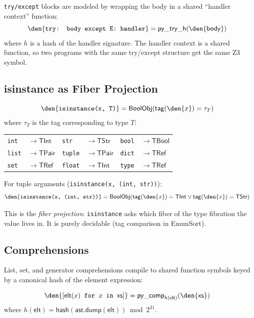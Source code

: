 \texttt{try/except} blocks are modeled by wrapping the body in a
shared ``handler context'' function:
\[
  \den{\texttt{try: body except E: handler}} =
  \mathsf{py\_try\_h}(\den{\mathsf{body}})
\]
where $h$ is a hash of the handler signature.  The handler context
is a shared function, so two programs with the same try/except
structure get the same Z3 symbol.

\subsection{isinstance as Fiber Projection}

\begin{definition}
\[
  \den{\texttt{isinstance(x, T)}} = \mathsf{BoolObj}(\mathsf{tag}(\den{x}) = \tau_T)
\]
where $\tau_T$ is the tag corresponding to type $T$:

\begin{center}
\begin{tabular}{l l l l l l}
  \texttt{int} & $\to \mathsf{TInt}$ &
  \texttt{str} & $\to \mathsf{TStr}$ &
  \texttt{bool} & $\to \mathsf{TBool}$ \\
  \texttt{list} & $\to \mathsf{TPair}$ &
  \texttt{tuple} & $\to \mathsf{TPair}$ &
  \texttt{dict} & $\to \mathsf{TRef}$ \\
  \texttt{set} & $\to \mathsf{TRef}$ &
  \texttt{float} & $\to \mathsf{TInt}$ &
  \texttt{type} & $\to \mathsf{TRef}$
\end{tabular}
\end{center}

For tuple arguments (\texttt{isinstance(x, (int, str))}):
\[
  \den{\texttt{isinstance(x, (int, str))}} =
    \mathsf{BoolObj}(\mathsf{tag}(\den{x}) = \mathsf{TInt} \lor
    \mathsf{tag}(\den{x}) = \mathsf{TStr})
\]
\end{definition}

This is the \emph{fiber projection}: \texttt{isinstance} asks
which fiber of the type fibration the value lives in.  It is
purely decidable (tag comparison in EnumSort).

\subsection{Comprehensions}

List, set, and generator comprehensions compile to shared function
symbols keyed by a canonical hash of the element expression:

\begin{definition}
\[
  \den{[\mathsf{elt}(x) \texttt{ for } x \texttt{ in } \mathsf{xs}]}
  = \mathsf{py\_comp}_{h(\mathsf{elt})}(\den{\mathsf{xs}})
\]
where $h(\mathsf{elt}) = \mathsf{hash}(\mathsf{ast.dump}(\mathsf{elt}))
\bmod 2^{31}$.
\end{definition}


